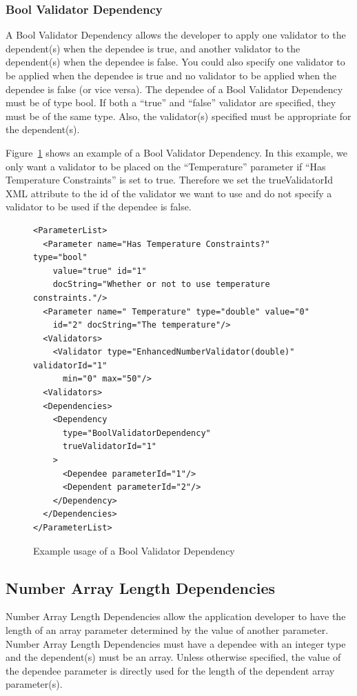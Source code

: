 \subsubsection{Bool Validator Dependency}
A Bool Validator Dependency allows the developer to apply one validator to the dependent(s) when the dependee is true, and another validator
to the dependent(s) when the dependee is false. You could also specify one validator to be applied when the dependee is true and no validator
to be applied when the dependee is false (or vice versa). The dependee of a Bool Validator Dependency must be of type bool. If both a ``true'' and
``false'' validator are specified, they must be of the same type. Also, the validator(s) specified must be appropriate for the dependent(s).

Figure~\ref{BoolValidDepXML} shows an example of a Bool Validator Dependency. In this example, we only want a validator to be placed on the
``Temperature'' parameter if ``Has Temperature Constraints'' is set to true. Therefore we set the trueValidatorId XML attribute to the id of the
validator we want to use and do not specify a validator to be used if the dependee is false.
\begin{figure}
\centering
{\footnotesize
\begin{Verbatim}
<ParameterList>
  <Parameter name="Has Temperature Constraints?" type="bool" 
    value="true" id="1" 
    docString="Whether or not to use temperature constraints."/>
  <Parameter name=" Temperature" type="double" value="0"
    id="2" docString="The temperature"/>
  <Validators>
    <Validator type="EnhancedNumberValidator(double)" validatorId="1"
      min="0" max="50"/>
  <Validators>
  <Dependencies>
    <Dependency 
      type="BoolValidatorDependency" 
      trueValidatorId="1"
    >
      <Dependee parameterId="1"/>
      <Dependent parameterId="2"/>
    </Dependency>
  </Dependencies>
</ParameterList>
\end{Verbatim}
}
\caption{Example usage of a Bool Validator Dependency}
\label{BoolValidDepXML}
\end{figure}

\subsection{Number Array Length Dependencies}
Number Array Length Dependencies allow the application developer to have the length of an array parameter determined by the value of another parameter. Number Array Length
Dependencies must have a dependee with an integer type and the dependent(s) must be an array. Unless otherwise specified, the value of the dependee parameter is directly
used for the length of the dependent array parameter(s). 

